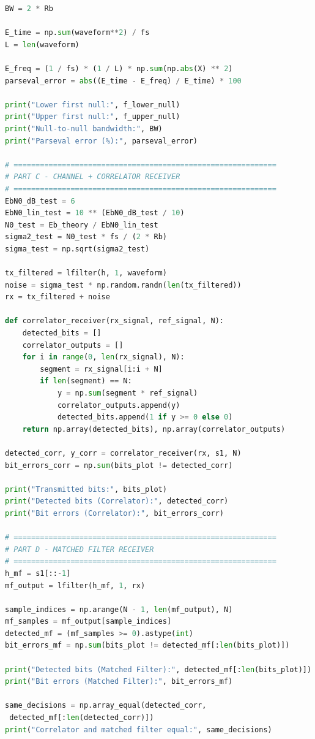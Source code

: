 \begin{lstlisting}[language=Python,
    caption={Complete Python implementation for Batch 9 BPSK system},
    basicstyle=\ttfamily\small,
    breaklines=true,
    showstringspaces=false]
BW = 2 * Rb

E_time = np.sum(waveform**2) / fs
L = len(waveform)

E_freq = (1 / fs) * (1 / L) * np.sum(np.abs(X) ** 2)
parseval_error = abs((E_time - E_freq) / E_time) * 100

print("Lower first null:", f_lower_null)
print("Upper first null:", f_upper_null)
print("Null-to-null bandwidth:", BW)
print("Parseval error (%):", parseval_error)

# ============================================================
# PART C - CHANNEL + CORRELATOR RECEIVER
# ============================================================
EbN0_dB_test = 6
EbN0_lin_test = 10 ** (EbN0_dB_test / 10)
N0_test = Eb_theory / EbN0_lin_test
sigma2_test = N0_test * fs / (2 * Rb)
sigma_test = np.sqrt(sigma2_test)

tx_filtered = lfilter(h, 1, waveform)
noise = sigma_test * np.random.randn(len(tx_filtered))
rx = tx_filtered + noise

def correlator_receiver(rx_signal, ref_signal, N):
    detected_bits = []
    correlator_outputs = []
    for i in range(0, len(rx_signal), N):
        segment = rx_signal[i:i + N]
        if len(segment) == N:
            y = np.sum(segment * ref_signal)
            correlator_outputs.append(y)
            detected_bits.append(1 if y >= 0 else 0)
    return np.array(detected_bits), np.array(correlator_outputs)

detected_corr, y_corr = correlator_receiver(rx, s1, N)
bit_errors_corr = np.sum(bits_plot != detected_corr)

print("Transmitted bits:", bits_plot)
print("Detected bits (Correlator):", detected_corr)
print("Bit errors (Correlator):", bit_errors_corr)

# ============================================================
# PART D - MATCHED FILTER RECEIVER
# ============================================================
h_mf = s1[::-1]
mf_output = lfilter(h_mf, 1, rx)

sample_indices = np.arange(N - 1, len(mf_output), N)
mf_samples = mf_output[sample_indices]
detected_mf = (mf_samples >= 0).astype(int)
bit_errors_mf = np.sum(bits_plot != detected_mf[:len(bits_plot)])

print("Detected bits (Matched Filter):", detected_mf[:len(bits_plot)])
print("Bit errors (Matched Filter):", bit_errors_mf)

same_decisions = np.array_equal(detected_corr,
 detected_mf[:len(detected_corr)])
print("Correlator and matched filter equal:", same_decisions)


\end{lstlisting}
